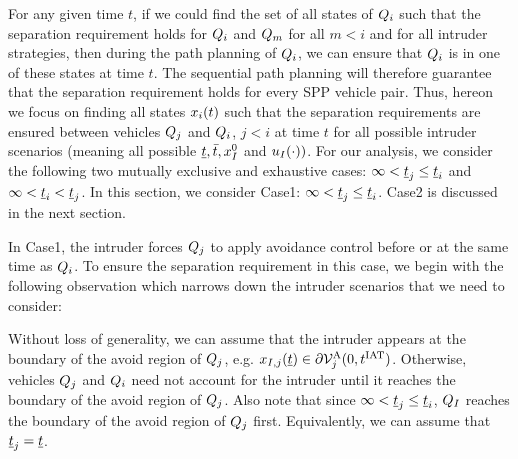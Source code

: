 For any given time $t$, if we could find the set of all states of $Q_i$ such that the separation requirement holds for $Q_i$ and $Q_m$ for all $m<i$ and for all intruder strategies, then during the path planning of $Q_i$, we can ensure that $Q_i$ is in one of these states at time $t$. The sequential path planning will therefore guarantee that the separation requirement holds for every SPP vehicle pair. Thus, hereon we focus on finding all states $x_i(t)$ such that the separation requirements are ensured between vehicles $Q_j$ and $Q_i$, $j <i$ at time $t$ for all possible intruder scenarios (meaning all possible $\underline{t}, \bar{t}, x_{I}^0$ and $u_{I}(\cdot))$. For our analysis, we consider the following two mutually exclusive and exhaustive cases: $\infty < \underline{t}_j \leq \underline{t}_i$ and $\infty < \underline{t}_i < \underline{t}_j$. %
In this section, we consider Case1: $\infty < \underline{t}_j \leq \underline{t}_i$. Case2 is discussed in the next section.  

In Case1, the intruder forces $Q_j$ to apply avoidance control before or at the same time as $Q_i$. %
To ensure the separation requirement in this case, we begin with the following observation which narrows down the intruder scenarios that we need to consider:
\begin{observation} \label{obs1_case1}
Without loss of generality, we can assume that the intruder appears at the boundary of the avoid region of $Q_j$, e.g. $x_{I, j}(\underline{t}) \in \partial \mathcal{V}^{\text{A}}_{j}(0, t^\text{IAT})$. Otherwise, vehicles $Q_j$ and $Q_i$ need not account for the intruder until it reaches the boundary of the avoid region of $Q_j$. Also note that since $\infty < \underline{t}_j \leq \underline{t}_i$, $Q_{I}$ reaches the boundary of the avoid region of $Q_j$ first. Equivalently, we can assume that $\underline{t}_j = \underline{t}$.
\end{observation}